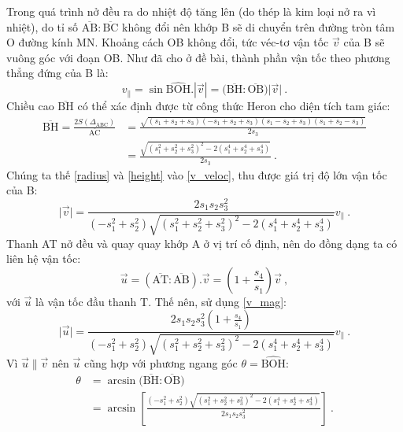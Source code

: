 Trong quá trình nở đều ra do nhiệt độ tăng lên (do thép là kim loại nở ra vì nhiệt), do tỉ số $\overline{\text{AB}}:\overline{\text{BC}}$ không đổi nên khớp B sẽ di chuyển trên đường tròn tâm O đường kính MN. Khoảng cách OB không đổi, tức véc-tơ vận tốc $\overrightarrow{v}$ của B sẽ vuông góc với đoạn OB. Như đã cho ở đề bài, thành phần vận tốc theo phương thẳng đứng của B là:
\begin{equation}
v_{\parallel} = \sin \widehat{\text{BOH}} .|\overrightarrow{v}| = \Big( \overline{\text{BH}}:\overline{\text{OB}}\Big) \vert \overrightarrow{v} \vert \ .
\label{v_veloc}
\end{equation}
Chiều cao $\overline{\text{BH}}$ có thể xác định được từ công thức Heron cho diện tích tam giác:
\begin{equation}
\begin{split}
\overline{\text{BH}} = \frac{2S(\Delta_{\text{ABC}})}{\overline{\text{AC}}} & = \frac{\sqrt{(s_1+s_2+s_3)(-s_1+s_2+s_3)(s_1-s_2+s_3)(s_1+s_2-s_3)}}{2s_3}
\\
& = \frac{\sqrt{(s_1^2+s_2^2+s_3^2)^2-2(s_1^4+s_2^4+s_3^4)}}{2s_3} \ .
\end{split}
\label{height}
\end{equation}
Chúng ta thế \eqref{radius} và \eqref{height} vào \eqref{v_veloc}, thu được giá trị độ lớn vận tốc của B:
\begin{equation}
\vert \overrightarrow{v} \vert = \frac{2s_1s_2 s_3^2}{(-s_1^2 + s_2^2)\sqrt{(s_1^2+s_2^2+s_3^2)^2-2(s_1^4+s_2^4+s_3^4)}} v_{\parallel} \ .
\label{v_mag}
\end{equation}
Thanh AT nở đều và quay quay khớp A ở vị trí cố định, nên do đồng dạng ta có liên hệ vận tốc:
 \begin{equation}
 \overrightarrow{u} = \left(\overline{\text{AT}} : \overline{\text{AB}} \right) . \overrightarrow{v} = \left( 1 + \frac{s_4}{s_1} \right) \overrightarrow{v} \ ,
 \end{equation}
 với $\overrightarrow{u}$ là vận tốc đầu thanh T. Thế nên, sử dụng \eqref{v_mag}:
\begin{equation}
\vert \overrightarrow{u} \vert = \frac{2s_1s_2 s_3^2 \left( 1 + \frac{s_4}{s_1}\right)}{(-s_1^2 + s_2^2)\sqrt{(s_1^2+s_2^2+s_3^2)^2-2(s_1^4+s_2^4+s_3^4)}} v_{\parallel} \ .
\label{u_mag}
\end{equation}
Vì $\overrightarrow{u} \parallel \overrightarrow{v}$ nên $\overrightarrow{u}$ cũng hợp với phương ngang góc $\theta = \widehat{\text{BOH}}$:
\begin{equation}
\begin{split}
 \theta &= \arcsin \Big( \overline{\text{BH}}:\overline{\text{OB}}\Big)
 \\
&= \arcsin \left[ \frac{(-s_1^2 + s_2^2)\sqrt{(s_1^2+s_2^2+s_3^2)^2-2(s_1^4+s_2^4+s_3^4)}}{2s_1s_2 s_3^2} \right] \ .
\end{split}
\label{angle}
\end{equation}

